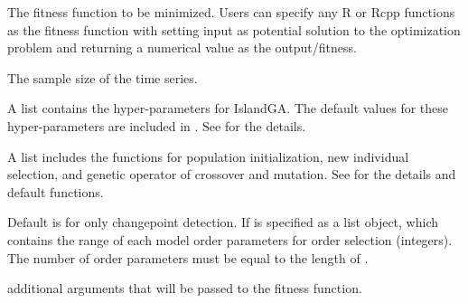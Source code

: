 \documentclass[a4paper]{book}
\begin{document}
\begin{Arguments}
\begin{ldescription}
\item[\code{ObjFunc}] The fitness function to be minimized. Users can specify any R or Rcpp
functions as the fitness function with setting input as potential solution to
the optimization problem and returning a numerical value as the output/fitness.

\item[\code{N}] The sample size of the time series.

\item[\code{IslandGA\_param}] A list contains the hyper-parameters for IslandGA.
The default values for these hyper-parameters are included in .
See  for the details.

\item[\code{IslandGA\_operators}] A list includes the functions for population initialization,
new individual selection, and genetic operator of crossover and mutation.
See  for the details and default functions.

\item[\code{p.range}] Default is  for only changepoint detection. If
 is specified as a list object, which contains the range of
each model order parameters for order selection (integers). The number of
order parameters must be equal to the length of .

\item[\code{...}] additional arguments that will be passed to the fitness function.
\end{ldescription}
\end{Arguments}
%
\end{document}
